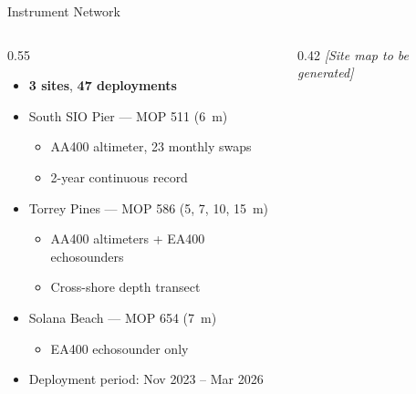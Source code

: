 \documentclass[10pt, aspectratio=169]{beamer}
\begin{document}
\begin{frame}{Instrument Network}
  \begin{columns}[T]
    \begin{column}{0.55\textwidth}
      \begin{itemize}
        \item \textbf{3 sites}, \textbf{47 deployments}
        \item South SIO Pier --- MOP 511 (6~m)
          \begin{itemize}
            \item AA400 altimeter, 23 monthly swaps
            \item 2-year continuous record
          \end{itemize}
        \item Torrey Pines --- MOP 586 (5, 7, 10, 15~m)
          \begin{itemize}
            \item AA400 altimeters + EA400 echosounders
            \item Cross-shore depth transect
          \end{itemize}
        \item Solana Beach --- MOP 654 (7~m)
          \begin{itemize}
            \item EA400 echosounder only
          \end{itemize}
        \item Deployment period: Nov 2023 -- Mar 2026
      \end{itemize}
    \end{column}
    \begin{column}{0.42\textwidth}
      \centering\textit{[Site map to be generated]}
    \end{column}
  \end{columns}
\end{frame}
\end{document}
